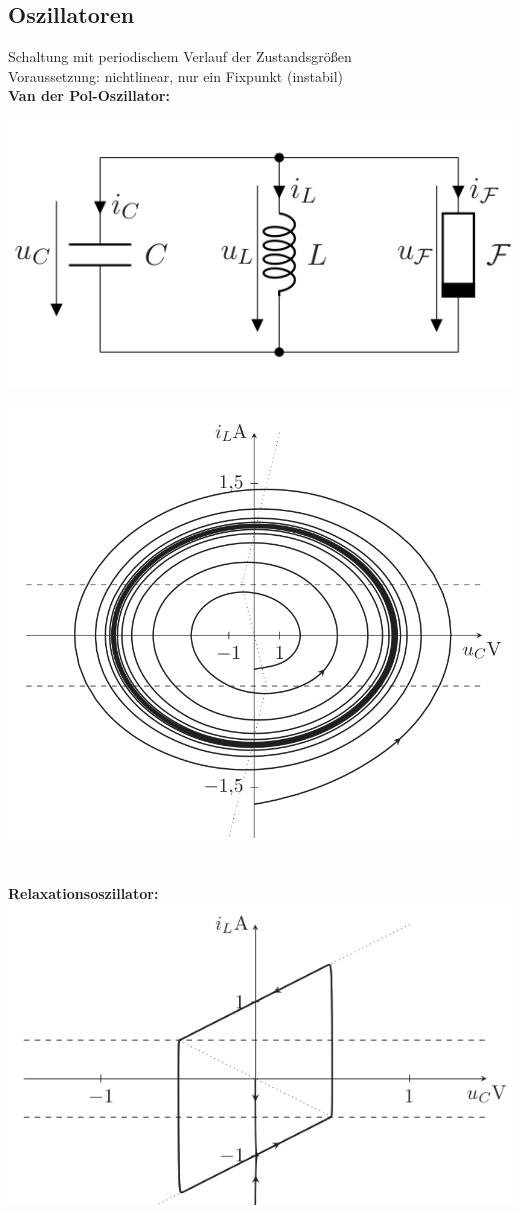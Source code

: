 \documentclass[fs, footer]{latex4ei}
\begin{document}
\begin{multicols*}{4}
    \subsection{Oszillatoren}
    Schaltung mit periodischem Verlauf der Zustandsgrößen\\
    Voraussetzung: nichtlinear, nur ein Fixpunkt (instabil)\\
    \textbf{Van der Pol-Oszillator:}\\
    \parbox{.5\linewidth}{\includegraphics[width=\linewidth]{img/van-der-pol}}
    \parbox{.5\linewidth}{\includegraphics[width=\linewidth]{img/fast-harmonischer-oszillator}}\\
    \textbf{Relaxationsoszillator:}\\
    \includegraphics[width=.5\linewidth]{img/relaxationsoszillator}

\end{multicols*}
\end{document}
